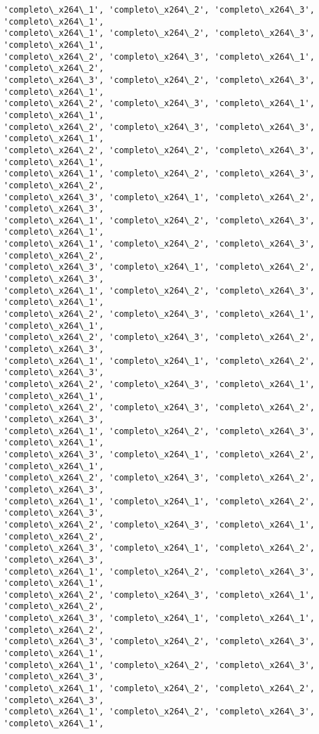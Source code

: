 \documentclass[11pt]{article}
\begin{document}
\begin{Verbatim}[commandchars=\\\{\}]
'completo\_x264\_1', 'completo\_x264\_2', 'completo\_x264\_3', 'completo\_x264\_1',
'completo\_x264\_1', 'completo\_x264\_2', 'completo\_x264\_3', 'completo\_x264\_1',
'completo\_x264\_2', 'completo\_x264\_3', 'completo\_x264\_1', 'completo\_x264\_2',
'completo\_x264\_3', 'completo\_x264\_2', 'completo\_x264\_3', 'completo\_x264\_1',
'completo\_x264\_2', 'completo\_x264\_3', 'completo\_x264\_1', 'completo\_x264\_1',
'completo\_x264\_2', 'completo\_x264\_3', 'completo\_x264\_3', 'completo\_x264\_1',
'completo\_x264\_2', 'completo\_x264\_2', 'completo\_x264\_3', 'completo\_x264\_1',
'completo\_x264\_1', 'completo\_x264\_2', 'completo\_x264\_3', 'completo\_x264\_2',
'completo\_x264\_3', 'completo\_x264\_1', 'completo\_x264\_2', 'completo\_x264\_3',
'completo\_x264\_1', 'completo\_x264\_2', 'completo\_x264\_3', 'completo\_x264\_1',
'completo\_x264\_1', 'completo\_x264\_2', 'completo\_x264\_3', 'completo\_x264\_2',
'completo\_x264\_3', 'completo\_x264\_1', 'completo\_x264\_2', 'completo\_x264\_3',
'completo\_x264\_1', 'completo\_x264\_2', 'completo\_x264\_3', 'completo\_x264\_1',
'completo\_x264\_2', 'completo\_x264\_3', 'completo\_x264\_1', 'completo\_x264\_1',
'completo\_x264\_2', 'completo\_x264\_3', 'completo\_x264\_2', 'completo\_x264\_3',
'completo\_x264\_1', 'completo\_x264\_1', 'completo\_x264\_2', 'completo\_x264\_3',
'completo\_x264\_2', 'completo\_x264\_3', 'completo\_x264\_1', 'completo\_x264\_1',
'completo\_x264\_2', 'completo\_x264\_3', 'completo\_x264\_2', 'completo\_x264\_3',
'completo\_x264\_1', 'completo\_x264\_2', 'completo\_x264\_3', 'completo\_x264\_1',
'completo\_x264\_3', 'completo\_x264\_1', 'completo\_x264\_2', 'completo\_x264\_1',
'completo\_x264\_2', 'completo\_x264\_3', 'completo\_x264\_2', 'completo\_x264\_3',
'completo\_x264\_1', 'completo\_x264\_1', 'completo\_x264\_2', 'completo\_x264\_3',
'completo\_x264\_2', 'completo\_x264\_3', 'completo\_x264\_1', 'completo\_x264\_2',
'completo\_x264\_3', 'completo\_x264\_1', 'completo\_x264\_2', 'completo\_x264\_3',
'completo\_x264\_1', 'completo\_x264\_2', 'completo\_x264\_3', 'completo\_x264\_1',
'completo\_x264\_2', 'completo\_x264\_3', 'completo\_x264\_1', 'completo\_x264\_2',
'completo\_x264\_3', 'completo\_x264\_1', 'completo\_x264\_1', 'completo\_x264\_2',
'completo\_x264\_3', 'completo\_x264\_2', 'completo\_x264\_3', 'completo\_x264\_1',
'completo\_x264\_1', 'completo\_x264\_2', 'completo\_x264\_3', 'completo\_x264\_3',
'completo\_x264\_1', 'completo\_x264\_2', 'completo\_x264\_2', 'completo\_x264\_3',
'completo\_x264\_1', 'completo\_x264\_2', 'completo\_x264\_3', 'completo\_x264\_1',

\end{Verbatim}
\end{document}
